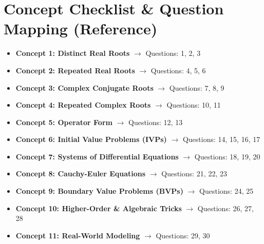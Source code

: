 \documentclass[12pt]{article}
\begin{document}
\section{Concept Checklist \& Question Mapping (Reference)}
\begin{itemize}
    \item \textbf{Concept 1: Distinct Real Roots} $\rightarrow$ Questions: 1, 2, 3
    \item \textbf{Concept 2: Repeated Real Roots} $\rightarrow$ Questions: 4, 5, 6
    \item \textbf{Concept 3: Complex Conjugate Roots} $\rightarrow$ Questions: 7, 8, 9
    \item \textbf{Concept 4: Repeated Complex Roots} $\rightarrow$ Questions: 10, 11
    \item \textbf{Concept 5: Operator Form} $\rightarrow$ Questions: 12, 13
    \item \textbf{Concept 6: Initial Value Problems (IVPs)} $\rightarrow$ Questions: 14, 15, 16, 17
    \item \textbf{Concept 7: Systems of Differential Equations} $\rightarrow$ Questions: 18, 19, 20
    \item \textbf{Concept 8: Cauchy-Euler Equations} $\rightarrow$ Questions: 21, 22, 23
    \item \textbf{Concept 9: Boundary Value Problems (BVPs)} $\rightarrow$ Questions: 24, 25
    \item \textbf{Concept 10: Higher-Order \& Algebraic Tricks} $\rightarrow$ Questions: 26, 27, 28
    \item \textbf{Concept 11: Real-World Modeling} $\rightarrow$ Questions: 29, 30
\end{itemize}
\end{document}
